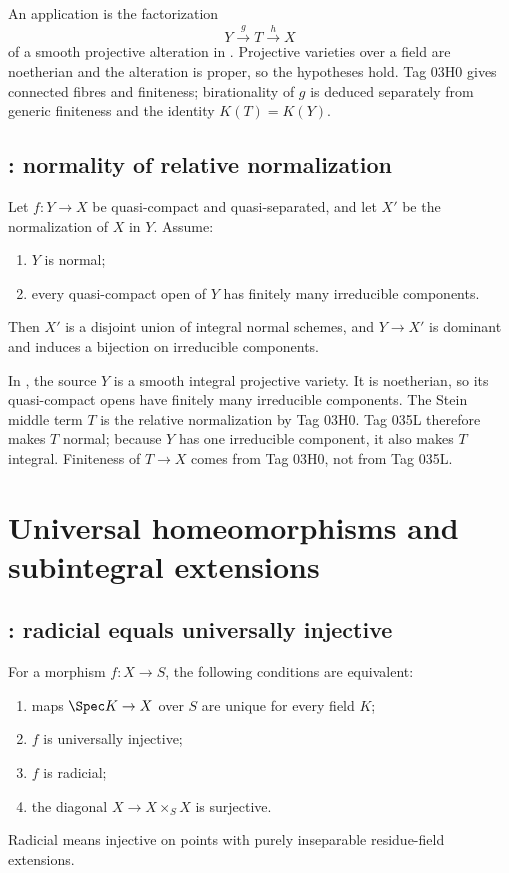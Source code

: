 An application is the factorization
\[
                         Y\xrightarrow{g}T\xrightarrow{h}X
\]
of a smooth projective alteration in
. Projective varieties over a field are
noetherian and the alteration is proper, so the hypotheses hold. Tag 03H0
gives connected fibres and finiteness; birationality of \(g\) is deduced
separately from generic finiteness and the identity \(K(T)=K(Y)\).

\subsection*{: normality of relative normalization}
\label{sec:stacks-tag-035L}

Let \(f:Y\to X\) be quasi-compact and quasi-separated, and let \(X'\) be
the normalization of \(X\) in \(Y\). Assume:
\begin{enumerate}
\item \(Y\) is normal;
\item every quasi-compact open of \(Y\) has finitely many irreducible
components.
\end{enumerate}
Then \(X'\) is a disjoint union of integral normal schemes, and
\(Y\to X'\) is dominant and induces a bijection on irreducible components.

In , the source \(Y\) is a smooth integral
projective variety. It is noetherian, so its quasi-compact opens have
finitely many irreducible components. The Stein middle term \(T\) is the
relative normalization by Tag 03H0. Tag 035L therefore makes \(T\) normal;
because \(Y\) has one irreducible component, it also makes \(T\) integral.
Finiteness of \(T\to X\) comes from Tag 03H0, not from Tag 035L.

\section{Universal homeomorphisms and subintegral extensions}
\label{sec:stacks-universal-homeomorphisms}

\subsection*{: radicial equals universally injective}
\label{sec:stacks-tag-01S4}

For a morphism \(f:X\to S\), the following conditions are equivalent:
\begin{enumerate}
\item maps \(\Spec K\to X\) over \(S\) are unique for every field \(K\);
\item \(f\) is universally injective;
\item \(f\) is radicial;
\item the diagonal \(X\to X\times_SX\) is surjective.
\end{enumerate}
Radicial means injective on points with purely inseparable residue-field
extensions.

